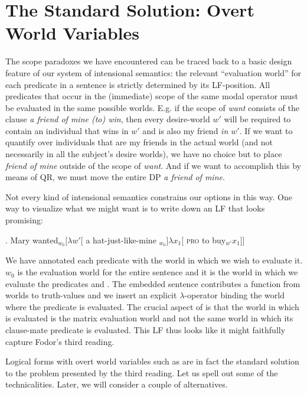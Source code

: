 \section{The Standard Solution: Overt World Variables}

The scope paradoxes we have encountered can be traced back to a basic design feature of our system of intensional semantics: the relevant ``evaluation world'' for each predicate in a sentence is strictly determined by its LF-position. All predicates that occur in the (immediate) scope of the same modal operator must be evaluated in the same possible worlds. E.g. if the scope of \emph{want} consists of the clause \emph{a friend of mine (to) win}, then every desire-world $w'$ will be required to contain an individual that wins in $w'$ and is also my friend \emph{in $w'$}. If we want to quantify over individuals that are my friends in the actual world (and not necessarily in all the subject's desire worlds), we have no choice but to place \emph{friend of mine} outside of the scope of \emph{want}. And if we want to accomplish this by means of QR, we must move the entire DP \emph{a friend of mine}.

Not every kind of intensional semantics constrains our options in this way. One way to visualize what we might want is to write down an LF that looks promising:

\ex. Mary wanted$_{w_0} [ \lambda w' [$ a hat-just-like-mine $_{w_0}] \lambda x_1 [$ \textsc{pro} to buy$_{w'} x_{1} ]]$

We have annotated each predicate with the world in which we wish to evaluate it. $w_0$ is the evaluation world for the entire sentence and it is the world in which we evaluate the predicates  and . The embedded sentence contributes a function from worlds to truth-values and we insert an explicit $\lambda$-operator binding the world where the predicate  is evaluated. The crucial aspect of \Last is that the world in which  is evaluated is the matrix evaluation world and not the same world in which its clause-mate predicate  is evaluated. This LF thus looks like it might faithfully capture Fodor's third reading.

Logical forms with overt world variables such as \Last are in fact the standard solution to the problem presented by the third reading. Let us spell out some of the technicalities. Later, we will consider a couple of alternatives.

